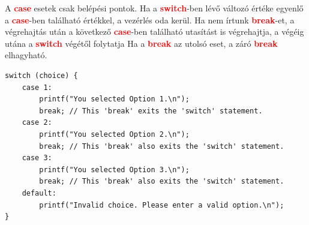 \documentclass[11pt,a4paper]{article}
\begin{document}
            \begin{tcolorbox}[colback=blue!5!white,colframe=blue!50!black,title= 49. Ismertesse a „break” utasítás szerepét a „switch” utasításban!]
                A \textcolor{red}{\textbf{case}} esetek csak belépési pontok. Ha a \textcolor{red}{\textbf{switch}}-ben lévő változó értéke egyenlő a \textcolor{red}{\textbf{case}}-ben található értékkel, a vezérlés oda kerül. Ha nem írtunk \textcolor{red}{\textbf{break}}-et, a végrehajtás után a következő \textcolor{red}{\textbf{case}}-ben található utasítást is végrehajtja, a végéig  utána a \textcolor{red}{\textbf{switch}} végétől folytatja Ha a \textcolor{red}{\textbf{break}} az utolsó eset, a záró \textcolor{red}{\textbf{break}} elhagyható.
                \begin{Verbatim}
switch (choice) {
    case 1:
        printf("You selected Option 1.\n");
        break; // This 'break' exits the 'switch' statement.                            
    case 2:
        printf("You selected Option 2.\n");
        break; // This 'break' also exits the 'switch' statement.                     
    case 3:
        printf("You selected Option 3.\n");
        break; // This 'break' also exits the 'switch' statement.                       
    default:
        printf("Invalid choice. Please enter a valid option.\n");
}
\end{Verbatim}
            \end{tcolorbox}
\end{document}
